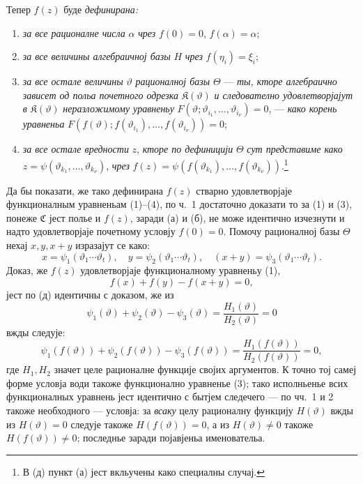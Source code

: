 ﻿\documentclass[11pt]{article}
\providecommand{\Cfield}{\mathfrak C}
\providecommand{\Kfield}{\mathfrak K}
\begin{document}
Тепер \(f(z)\) буде {\itshape дефинирана:}
\begin{enumerate}
\item[(а)] {\itshape за все рационалне числа} \(\alpha\) {\itshape чрез} \(f(0)=0\), \(f(\alpha)=\alpha\);
\item[(б)] {\itshape за все величины алгебраичној базы} \(H\) {\itshape чрез} \(f(\eta_i)=\xi_i\);
\item[(ц)] {\itshape за все остале величины} \(\vartheta\) {\itshape рационалној базы} \(\Theta\) --- {\itshape ты, кторе алгебраично зависет од польа почетного одрезка} \(\Kfield(\vartheta)\) {\itshape и следователно удовлетворјајут в} \(\Kfield(\vartheta)\) {\itshape неразложимому уравненьу} \(F(\vartheta;\vartheta_{i_1},\ldots,\vartheta_{i_\nu})=0\), --- {\itshape како корень уравненьа} \(F(f(\vartheta);f(\vartheta_{i_1}),\ldots,f(\vartheta_{i_\nu}))=0\);
\item[(д)] {\itshape за все остале вредности} \(z\), {\itshape кторе по дефиницији} \(\Theta\) {\itshape сут представиме како} \(z=\psi(\vartheta_{k_1},\ldots,\vartheta_{k_\nu})\), {\itshape чрез} \(f(z)=\psi(f(\vartheta_{k_1}),\ldots,f(\vartheta_{k_\nu}))\).\footnote{В (д) пункт (а) јест вкльучены како специалны случај.}
\end{enumerate}
Да бы показати, же тако дефинирана \(f(z)\) стварно удовлетворјаје функционалным уравненьам (1)--(4), по ч.~1 достаточно доказати то за (1) и (3), понеже \(\Cfield\) јест полье и \(f(z)\), заради (а) и (б), не може идентично изчезнути и надто удовлетворјаје почетному условју \(f(0)=0\). Помочу рационалној базы \(\Theta\) нехај \(x,y,x+y\) изразајут се како:
\[
x=\psi_1(\vartheta_1\cdots\vartheta_t),\quad
 y=\psi_2(\vartheta_1\cdots\vartheta_t),\quad
 (x+y)=\psi_3(\vartheta_1\cdots\vartheta_t).
\]
Доказ, же \(f(z)\) удовлетворјаје функционалному уравненьу (1),
\[
f(x)+f(y)-f(x+y)=0,
\]
јест по (д) идентичны с доказом, же из
\[
\psi_1(\vartheta)+\psi_2(\vartheta)-\psi_3(\vartheta)
 =\frac{H_1(\vartheta)}{H_2(\vartheta)}=0
\]
вжды следује:
\[
\psi_1(f(\vartheta))+\psi_2(f(\vartheta))-\psi_3(f(\vartheta))
 =\frac{H_1(f(\vartheta))}{H_2(f(\vartheta))}=0,
\]
где \(H_1,H_2\) значет целе рационалне функције својих аргументов. К точно тој самеј форме условја води такоже функционално уравненье (3); тако исполньенье всих функционалных уравнень јест идентично с бытјем следечего --- по чч.~1 и 2 такоже необходного --- условја: за {\itshape всаку} целу рационалну функцију \(H(\vartheta)\) вжды из \(H(\vartheta)=0\) следује такоже \(H(f(\vartheta))=0\), а из \(H(\vartheta)\ne0\) такоже \(H(f(\vartheta))\ne0\); последнье заради појавјеньа именовательа.
\end{document}

